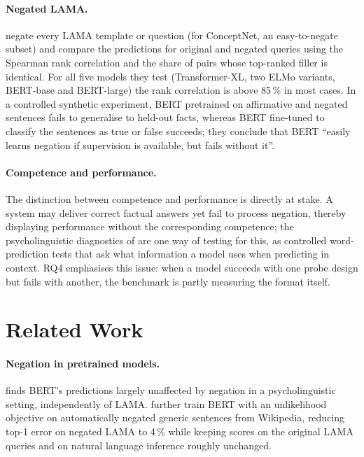 \documentclass{article}
\begin{document}
\paragraph{Negated LAMA.} \citet{kassner2020} negate every LAMA template or question (for ConceptNet, an easy-to-negate subset) and compare the predictions for original and negated queries using the Spearman rank correlation and the share of pairs whose top-ranked filler is identical. For all five models they test (Transformer-XL, two ELMo variants, BERT-base and BERT-large) the rank correlation is above 85\,\% in most cases. In a controlled synthetic experiment, BERT pretrained on affirmative and negated sentences fails to generalise to held-out facts, whereas BERT fine-tuned to classify the sentences as true or false succeeds; they conclude that BERT ``easily learns negation if supervision is available, but fails without it''.

\paragraph{Competence and performance.} The distinction between competence and performance is directly at stake. A system may deliver correct factual answers yet fail to process negation, thereby displaying performance without the corresponding competence; the psycholinguistic diagnostics of \citet{ettinger2020} are one way of testing for this, as controlled word-prediction tests that ask what information a model uses when predicting in context. RQ4 emphasises this issue: when a model succeeds with one probe design but fails with another, the benchmark is partly measuring the format itself.

\section{Related Work}
\label{sec:related}

\paragraph{Negation in pretrained models.} \citet{ettinger2020} finds BERT's predictions largely
unaffected by negation in a psycholinguistic setting, independently of LAMA. \citet{hosseini2021}
further train BERT with an unlikelihood objective on automatically negated generic sentences from Wikipedia, reducing top-1 error on negated LAMA to 4\,\% while keeping scores on the original LAMA queries and on natural language inference roughly unchanged.
\end{document}
